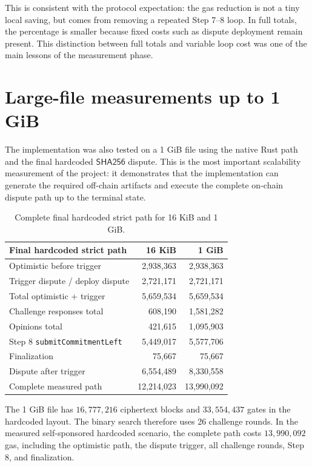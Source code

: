 This is consistent with the protocol expectation: the gas reduction is not a tiny local
saving, but comes from removing a repeated Step 7--8 loop. In full totals, the percentage
is smaller because fixed costs such as dispute deployment remain present. This distinction
between full totals and variable loop cost was one of the main lessons of the measurement
phase.

\section{Large-file measurements up to 1 GiB}

The implementation was also tested on a 1 GiB file using the native Rust path and the final
hardcoded \(\mathsf{SHA256}\) dispute. This is the most important scalability measurement of
the project: it demonstrates that the implementation can generate the required off-chain
artifacts and execute the complete on-chain dispute path up to the terminal state.

\begin{table}[htbp]
  \centering
  \small
  \begin{tabularx}{\linewidth}{>{\raggedright\arraybackslash}Xrr}
    \toprule
    Final hardcoded strict path & 16 KiB & 1 GiB \\
    \midrule
    Optimistic before trigger & 2,938,363 & 2,938,363 \\
    Trigger dispute / deploy dispute & 2,721,171 & 2,721,171 \\
    Total optimistic + trigger & 5,659,534 & 5,659,534 \\
    Challenge responses total & 608,190 & 1,581,282 \\
    Opinions total & 421,615 & 1,095,903 \\
    Step 8 \texttt{submitCommitmentLeft} & 5,449,017 & 5,577,706 \\
    Finalization & 75,667 & 75,667 \\
    Dispute after trigger & 6,554,489 & 8,330,558 \\
    \midrule
    Complete measured path & 12,214,023 & 13,990,092 \\
    \bottomrule
  \end{tabularx}
  \caption{Complete final hardcoded strict path for 16 KiB and 1 GiB.}
  \label{tab:hardcoded-strict-end-to-end}
\end{table}

The 1 GiB file has \(16,777,216\) ciphertext blocks and \(33,554,437\) gates in the
hardcoded layout. The binary search therefore uses 26 challenge rounds. In the measured
self-sponsored hardcoded scenario, the complete path costs \(13,990,092\) gas, including
the optimistic path, the dispute trigger, all challenge rounds, Step 8, and finalization.

